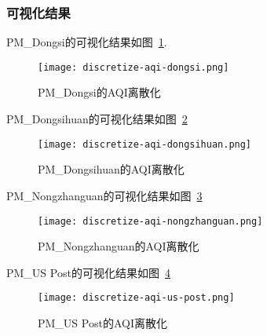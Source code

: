 \subsubsection{可视化结果}
PM\_Dongsi的可视化结果如图~\ref{fig:PMDongsi的AQI离散化}.

\begin{figure}[ht!]
    \centering
    \texttt{[image: discretize-aqi-dongsi.png]}
    \caption{PM\_Dongsi的AQI离散化}
    \label{fig:PMDongsi的AQI离散化}
\end{figure}

PM\_Dongsihuan的可视化结果如图~\ref{fig:PMDongsihuan的AQI离散化}

\begin{figure}[ht!]
    \texttt{[image: discretize-aqi-dongsihuan.png]}
    \centering
    \caption{PM\_Dongsihuan的AQI离散化}
    \label{fig:PMDongsihuan的AQI离散化}
\end{figure}

PM\_Nongzhanguan的可视化结果如图~\ref{fig:PMNongzhanguan的AQI离散化}
\begin{figure}[ht!]
    \texttt{[image: discretize-aqi-nongzhanguan.png]}
    \centering
    \caption{PM\_Nongzhanguan的AQI离散化}
    \label{fig:PMNongzhanguan的AQI离散化}
\end{figure}

PM\_US Post的可视化结果如图~\ref{fig:PMUS Post的AQI离散化}
\begin{figure}[ht!]
    \texttt{[image: discretize-aqi-us-post.png]}
    \centering
    \caption{PM\_US Post的AQI离散化}
    \label{fig:PMUS Post的AQI离散化}
\end{figure}
